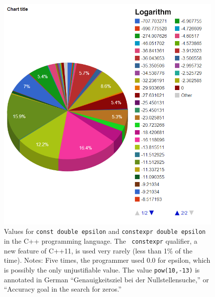 \documentclass[twocolumn]{article}
\begin{document}
\begin{figure}[ht]
\begin{center}
\includegraphics[width=0.99 \linewidth]{chart-cpp}
\end{center}\vspace{-0.1in}
\caption{
  Values for {\tt const double epsilon} and {\tt constexpr
    double epsilon} in the C++ programming language. The {\tt
    constexpr} qualifier, a new feature of C++11, is used very rarely
  (less than 1\% of the time).
  Notes:
  Five times, the programmer used 0.0 for epsilon, which is possibly
  the only unjustifiable value. The value {\tt pow(10,-13)} is
  annotated in German ``Genauigkeitsziel bei der Nullstellensuche,''
  or ``Accuracy goal in the search for zeros.'' }
\label{fig:cppdouble}
\end{figure}


{}

\end{document}
